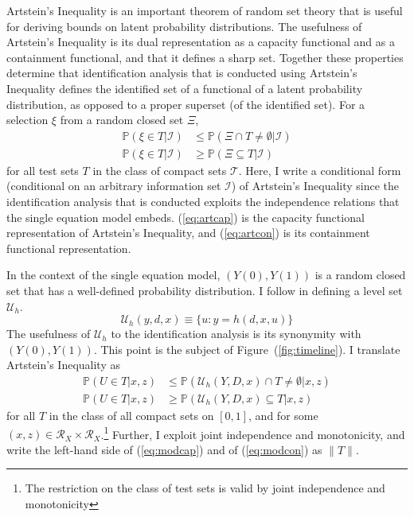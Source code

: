 \documentclass[10pt,a4paper,twoside]{article}
\numberwithin{equation}{section}
\newcommand{\Art}{Artstein's Inequality}
\begin{document}
{\Art} \citep{aR83} is an important theorem of random set theory that is useful for deriving bounds on latent probability distributions. The usefulness of {\Art} is its dual representation as a capacity functional and as a containment functional, and that it defines a sharp set. Together these properties determine that identification analysis that is conducted using {\Art} defines the identified set of a functional of a latent probability distribution, as opposed to a proper superset (of the identified set). For a selection $\xi$ from a random closed set $\Xi$,
\begin{align}
\mathbb{P}(\xi\in T|\mathcal{I})&\leq\mathbb{P}(\Xi\cap T\neq\emptyset|\mathcal{I})\label{eq:artcap}\\
\mathbb{P}(\xi\in T|\mathcal{I})&\geq\mathbb{P}(\Xi\subseteq T|\mathcal{I})\label{eq:artcon}
\end{align}
for all test sets $T$ in the class of compact sets $\mathcal{T}$. Here, I write a conditional form (conditional on an arbitrary information set $\mathcal{I}$) of {\Art} since the identification analysis that is conducted exploits the independence relations that the single equation model embeds. (\ref{eq:artcap}) is the capacity functional representation of {\Art}, and (\ref{eq:artcon}) is its containment functional representation. 

In the context of the single equation model, $(Y(0),Y(1))$ is a random closed set that has a well-defined probability distribution. I follow \cite{cr13} in defining a level set $\mathcal{U}_h$.
\[\mathcal{U}_h(y,d,x)\equiv\lbrace u : y=h(d,x,u)\rbrace\] 
The usefulness of $\mathcal{U}_h$ to the identification analysis is its synonymity with $(Y(0),Y(1))$. This point is the subject of Figure~(\ref{fig:timeline}). I translate {\Art} as 
\begin{align}
\mathbb{P}(U\in T|x,z)&\leq\mathbb{P}(\mathcal{U}_h(Y,D,x)\cap T\neq\emptyset|x,z)\label{eq:modcap}\\
\mathbb{P}(U\in T|x,z)&\geq\mathbb{P}(\mathcal{U}_h(Y,D,x)\subseteq T|x,z)\label{eq:modcon}
\end{align}
for all $T$ in the class of all compact sets on $[0,1]$, and for some $(x,z)\in\mathcal{R}_X\times\mathcal{R}_X$.\footnote{The restriction on the class of test sets is valid by joint independence and monotonicity} Further, I exploit joint independence and monotonicity, and write the left-hand side of (\ref{eq:modcap}) and of (\ref{eq:modcon}) as $\| T\|$. 
\end{document}
